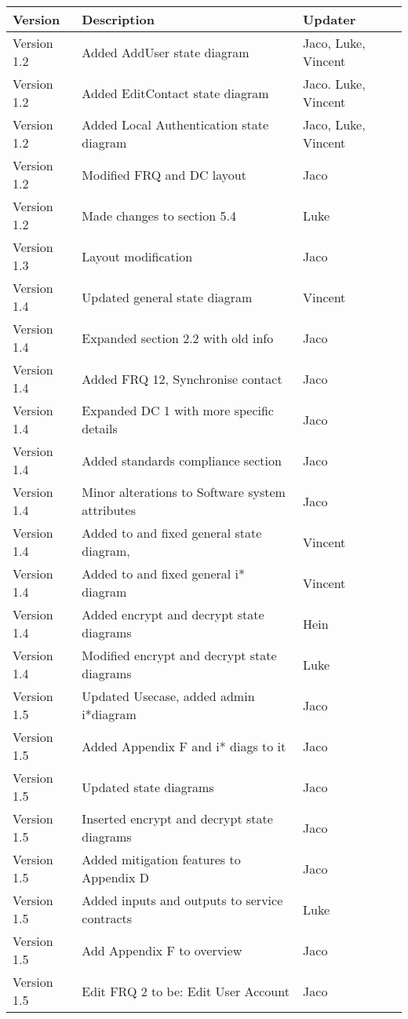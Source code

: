 \begin{center}
\begin{tabular}{|l|l|l|}
\hline
\textbf{Version} & \textbf{Description}&\textbf{Updater}\\ 
\hline
Version 1.2 &Added AddUser state diagram& Jaco, Luke, Vincent\\
\hline
Version 1.2 & Added EditContact state diagram & Jaco. Luke, Vincent\\
\hline
Version 1.2 & Added Local Authentication state diagram& Jaco, Luke, Vincent\\
\hline
Version 1.2 & Modified FRQ and DC layout & Jaco\\
\hline
Version 1.2 & Made changes to section 5.4 & Luke\\
\hline
Version 1.3 & Layout modification & Jaco\\
\hline
Version 1.4 & Updated general state diagram & Vincent\\
\hline
Version 1.4 & Expanded section 2.2 with old info& Jaco\\
\hline
Version 1.4 & Added FRQ 12, Synchronise contact& Jaco\\
\hline
Version 1.4 & Expanded DC 1 with more specific details& Jaco\\
\hline
Version 1.4 & Added standards compliance section& Jaco\\
\hline
Version 1.4 & Minor alterations to Software system attributes& Jaco\\
\hline
Version 1.4 & Added to and fixed general state diagram,&Vincent\\
\hline
Version 1.4 & Added to and fixed general i* diagram & Vincent\\
\hline
Version 1.4 & Added encrypt and decrypt state diagrams & Hein\\
\hline
Version 1.4 & Modified encrypt and decrypt state diagrams & Luke\\
\hline
Version 1.5 & Updated Usecase, added admin i*diagram& Jaco\\
\hline
Version 1.5 & Added Appendix F and i* diags to it &Jaco\\
\hline
Version 1.5 & Updated state diagrams &Jaco\\
\hline
Version 1.5 & Inserted encrypt and decrypt state diagrams&Jaco\\
\hline
Version 1.5 & Added mitigation features to Appendix D&Jaco\\
\hline
Version 1.5 & Added inputs and outputs to service contracts&Luke\\
\hline
Version 1.5 & Add Appendix F to overview & Jaco\\
\hline
Version 1.5 & Edit FRQ 2 to be:  Edit User Account & Jaco\\

\end{tabular}
\end{center}

